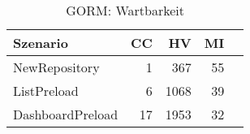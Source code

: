 \begin{table}[ht]
\centering
\caption{GORM: Wartbarkeit}
\begin{tabular}{lrrrr}
\toprule
Szenario & CC & HV & MI \\
\midrule
	NewRepository & 1 & 367 & 55 \\
	ListPreload & 6 & 1068 & 39 \\
	DashboardPreload & 17 & 1953 & 32 \\
\bottomrule
\end{tabular}
\label{tab:gorm_maintainability}
\end{table}
	